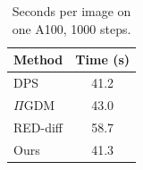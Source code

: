 \begin{table}[t]
  \centering
  \caption{Seconds per image on one A100, 1000 steps.}
  \label{tab:compute}
  \begin{tabular}{lc}
    \toprule
    Method & Time (s) \\
    \midrule
    DPS & 41.2 \\
    $\Pi$GDM & 43.0 \\
    RED-diff & 58.7 \\
    Ours & 41.3 \\
    \bottomrule
  \end{tabular}
\end{table}
